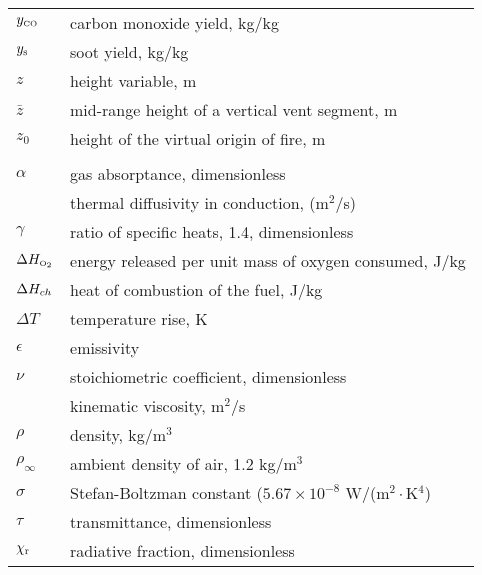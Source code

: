 \documentclass[12pt]{book}
\begin{document}
\begin{center}
\begin{longtable}{p{1in}  p{5.5 in}}
$y_{{\tiny \hbox{CO}}}$           & carbon monoxide yield, kg/kg \\
$y_{\rm s}$         & soot yield, kg/kg \\
$z$                 & height variable, m \\
$\bar{z}$           & mid-range height of a vertical vent segment, m \\
$z_0$               & height of the virtual origin of fire, m \\
  \\
$\alpha$            & gas absorptance, dimensionless \\
                    & thermal diffusivity in conduction, (m$^2$/s) \\
$\gamma$            & ratio of specific heats, 1.4, dimensionless \\
$\Delta H_{\tiny \hbox{O}_2}$              & energy released per unit mass of oxygen consumed, J/kg \\
$\Delta H_{ch}$               & heat of combustion of the fuel, J/kg \\
$\Delta T$          & temperature rise, K \\
$\epsilon$          & emissivity \\
$\nu$               & stoichiometric coefficient, dimensionless \\
                    & kinematic viscosity, m$^2$/s \\
$\rho$              & density, kg/m$^3$ \\
$\rho_\infty$       & ambient density of air, 1.2 kg/m$^3$ \\
$\sigma$            & Stefan-Boltzman constant ($5.67 \times 10^{-8}$ W/(m$^2\cdot$K$^4$) \\
$\tau$              & transmittance, dimensionless \\
$\chi_{\rm r}$      & radiative fraction, dimensionless \\
\end{longtable}

\end{center}


\end{document}
